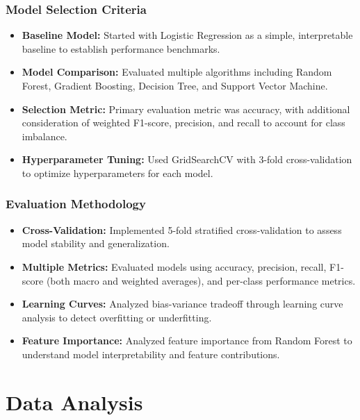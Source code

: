 \documentclass[12pt,a4paper]{article}
\begin{document}
\subsubsection{Model Selection Criteria}
\begin{itemize}
    \item \textbf{Baseline Model:} Started with Logistic Regression as a simple, interpretable baseline to establish performance benchmarks.
    \item \textbf{Model Comparison:} Evaluated multiple algorithms including Random Forest, Gradient Boosting, Decision Tree, and Support Vector Machine.
    \item \textbf{Selection Metric:} Primary evaluation metric was accuracy, with additional consideration of weighted F1-score, precision, and recall to account for class imbalance.
    \item \textbf{Hyperparameter Tuning:} Used GridSearchCV with 3-fold cross-validation to optimize hyperparameters for each model.
\end{itemize}

\subsubsection{Evaluation Methodology}
\begin{itemize}
    \item \textbf{Cross-Validation:} Implemented 5-fold stratified cross-validation to assess model stability and generalization.
    \item \textbf{Multiple Metrics:} Evaluated models using accuracy, precision, recall, F1-score (both macro and weighted averages), and per-class performance metrics.
    \item \textbf{Learning Curves:} Analyzed bias-variance tradeoff through learning curve analysis to detect overfitting or underfitting.
    \item \textbf{Feature Importance:} Analyzed feature importance from Random Forest to understand model interpretability and feature contributions.
\end{itemize}

\section{Data Analysis}
\end{document}
